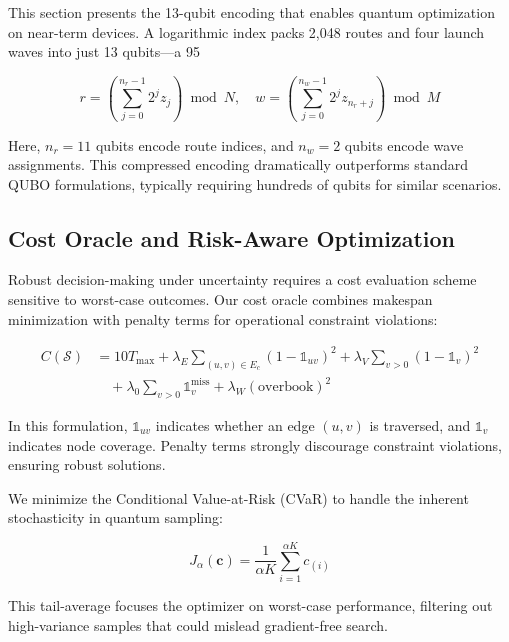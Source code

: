 This section presents the 13-qubit encoding that enables quantum optimization on near-term devices. A logarithmic index packs 2,048 routes and four launch waves into just 13 qubits—a 95%

\begin{equation}
r = \left(\sum_{j=0}^{n_r-1} 2^{j} z_j\right) \bmod N, \quad 
w = \left(\sum_{j=0}^{n_w-1} 2^{j} z_{n_r+j}\right) \bmod M
\label{eq:encoding}
\end{equation}

Here, $n_r=11$ qubits encode route indices, and $n_w=2$ qubits encode wave assignments. This compressed encoding dramatically outperforms standard QUBO formulations, typically requiring hundreds of qubits for similar scenarios.

\subsection{Cost Oracle and Risk-Aware Optimization}

Robust decision-making under uncertainty requires a cost evaluation scheme sensitive to worst-case outcomes. Our cost oracle combines makespan minimization with penalty terms for operational constraint violations:

\begin{equation}
\begin{split}
C(\mathcal{S}) &= 10 T_{\max} + \lambda_E \sum_{(u,v)\in E_c} (1-\mathbb{1}_{uv})^2 + \lambda_V \sum_{v>0}(1-\mathbb{1}_v)^2 \\
&\quad + \lambda_0 \sum_{v>0}\mathbb{1}_v^{\text{miss}} + \lambda_W (\text{overbook})^2
\end{split}
\label{eq:cost}
\end{equation}

In this formulation, $\mathbb{1}_{uv}$ indicates whether an edge $(u,v)$ is traversed, and $\mathbb{1}_v$ indicates node coverage. Penalty terms strongly discourage constraint violations, ensuring robust solutions.

We minimize the Conditional Value-at-Risk (CVaR) to handle the inherent stochasticity in quantum sampling:

\begin{equation}
J_{\alpha}(\mathbf{c}) = \frac{1}{\alpha K}\sum_{i=1}^{\alpha K} c_{(i)}
\label{eq:cvar}
\end{equation}

This tail-average focuses the optimizer on worst-case performance, filtering out high-variance samples that could mislead gradient-free search.

